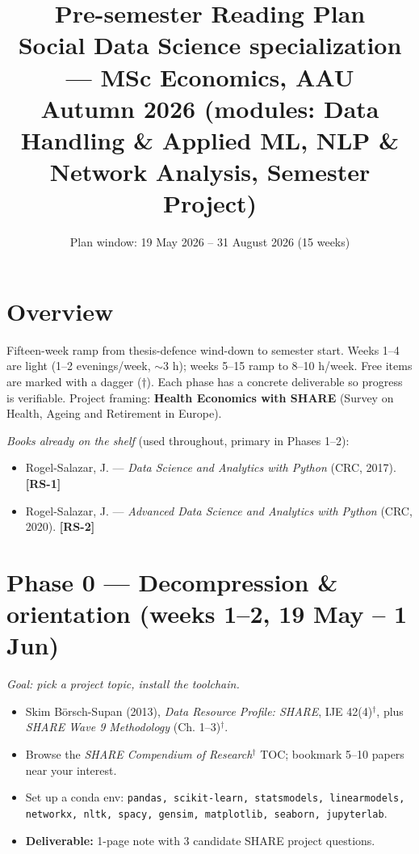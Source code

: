 \documentclass[11pt,a4paper]{article}
\title{\vspace{-1.5cm}\textbf{Pre-semester Reading Plan}\\[0.2em]
\large Social Data Science specialization --- MSc Economics, AAU\\[0.1em]
\normalsize Autumn 2026 (modules: Data Handling \& Applied ML, NLP \& Network Analysis, Semester Project)}
\author{}
\date{Plan window: 19 May 2026 -- 31 August 2026 \quad (15 weeks)}
\begin{document}
\maketitle
\thispagestyle{fancy}
\vspace{-1.6em}

\section*{Overview}
Fifteen-week ramp from thesis-defence wind-down to semester start. Weeks 1--4 are light (1--2 evenings/week, $\sim$3 h); weeks 5--15 ramp to 8--10 h/week. Free items are marked with a dagger ($\dagger$). Each phase has a concrete deliverable so progress is verifiable. Project framing: \textbf{Health Economics with SHARE} (Survey on Health, Ageing and Retirement in Europe).

\textit{Books already on the shelf} (used throughout, primary in Phases 1--2):
\begin{itemize}
  \item Rogel-Salazar, J. --- \textit{Data Science and Analytics with Python} (CRC, 2017). \textbf{[RS-1]}
  \item Rogel-Salazar, J. --- \textit{Advanced Data Science and Analytics with Python} (CRC, 2020). \textbf{[RS-2]}
\end{itemize}

\section{Phase 0 --- Decompression \& orientation (weeks 1--2, 19 May -- 1 Jun)}
\textit{Goal: pick a project topic, install the toolchain.}
\begin{itemize}
  \item Skim B\"orsch-Supan (2013), \textit{Data Resource Profile: SHARE}, IJE 42(4)$^\dagger$, plus \textit{SHARE Wave 9 Methodology} (Ch. 1--3)$^\dagger$.
  \item Browse the \textit{SHARE Compendium of Research}$^\dagger$ TOC; bookmark 5--10 papers near your interest.
  \item Set up a conda env: \texttt{pandas, scikit-learn, statsmodels, linearmodels, networkx, nltk, spacy, gensim, matplotlib, seaborn, jupyterlab}.
  \item \textbf{Deliverable:} 1-page note with 3 candidate SHARE project questions.
\end{itemize}
\end{document}
